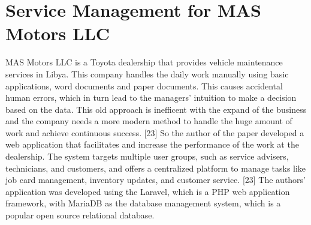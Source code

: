




\section{Service Management for MAS Motors LLC}

MAS Motors LLC is a Toyota dealership that provides vehicle maintenance services in Libya.
This company handles the daily work manually using basic applications, word documents and paper documents.
This causes accidental human errors, which in turn lead to the managers' intuition to make a decision based on the data.
This old approach is inefficent with the expand of the business and the company needs a more modern method to handle the huge amount of work and achieve continuous success. [23]
So the author of the paper developed a web application that facilitates and increase the performance of the work at the dealership.
The system targets multiple user groups, such as service advisers, technicians, and customers, and offers a centralized platform to manage tasks like job card management, inventory updates, and customer service. [23]
The authors' application was developed using the Laravel, which is a PHP web application framework, with MariaDB as the database management system, which is a popular open source relational database.


